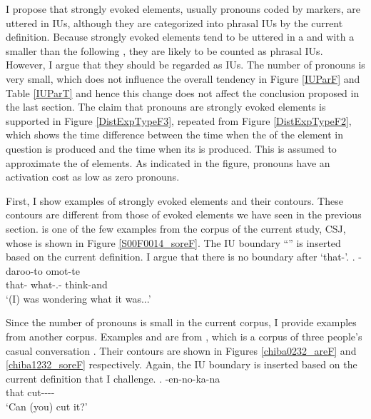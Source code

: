 I propose that strongly evoked elements, usually pronouns coded by  markers, are uttered in  IUs,
although they are categorized into phrasal IUs by the current definition.
Because strongly evoked elements tend to be uttered in a  and with a smaller  than the following ,
they are likely to be counted as phrasal IUs.
However, I argue that they should be regarded as  IUs.
The number of pronouns is very small, which does not influence the overall tendency in Figure \ref{IUParF} and Table \ref{IUParT} and
hence this change does not affect the conclusion proposed in the last section.
The claim that pronouns are strongly evoked elements
is supported in
Figure \ref{DistExpTypeF3},
repeated from Figure \ref{DistExpTypeF2},
which shows the time difference between
the time when the  of the element in question is produced and
the time when its  is produced.
This is assumed to approximate the  of elements.
As indicated in the figure,
pronouns have an activation cost as low as zero pronouns.

First, I show examples of strongly evoked elements and their  contours.
These  contours are different from those of evoked elements we have seen
in the previous section.
\Next is one of the few examples from the corpus of the current study, CSJ,
whose  is shown in Figure \ref{S00F0014_soreF}.
The IU boundary ``\iub'' is inserted based on the current definition.
I argue that there is no boundary after  `that-'.
%
\exg.\label{S00F0014_sore} \tp{\dvline} -daroo-to omot-te \tp{\dvline} \\
		that- {} what-.- think-and {} \\
		`(I) was wondering what it was...'

Since the number of pronouns is small in the current corpus,
I provide examples from another corpus.
Examples \Next and \NNext are from
,
which is a corpus of three people's casual conversation \cite{Den_2007_SAC}.
Their  contours are shown in Figures \ref{chiba0232_areF} and \ref{chiba1232_soreF} respectively.
Again, the IU boundary is inserted based on the current definition
that I challenge.
%
\exg.\label{chiba0232_are} \tp{\dvline} -en-no-ka-na \tp{\dvline} \\
		that {} cut---\ab{q}- {} \\
		`Can (you) cut it?'

